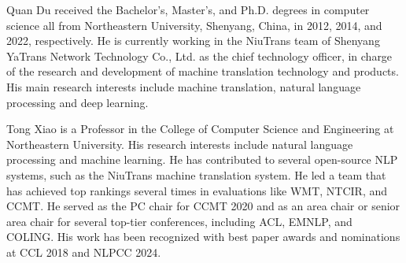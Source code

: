 \vspace{-10mm}
\begin{IEEEbiography}
{Quan Du}
received the Bachelor's, Master's, and Ph.D. degrees in computer science all from Northeastern University, Shenyang, China, in 2012, 2014, and 2022, respectively. He is currently working in the NiuTrans team of Shenyang YaTrans Network Technology Co., Ltd. as the chief technology officer, in charge of the research and development of machine translation technology and products. His main research interests include machine translation, natural language processing and deep learning. 
\end{IEEEbiography}
\vspace{-10mm}
\begin{IEEEbiography}
{Tong Xiao}
is a Professor in the College of Computer Science and Engineering at Northeastern University. His research interests include natural language processing and machine learning. He has contributed to several open-source NLP systems, such as the NiuTrans machine translation system. He led a team that has achieved top rankings several times in evaluations like WMT, NTCIR, and CCMT. He served as the PC chair for CCMT 2020 and as an area chair or senior area chair for several top-tier conferences, including ACL, EMNLP, and COLING. His work has been recognized with best paper awards and nominations at CCL 2018 and NLPCC 2024.
\end{IEEEbiography}
\vspace{-10mm}
